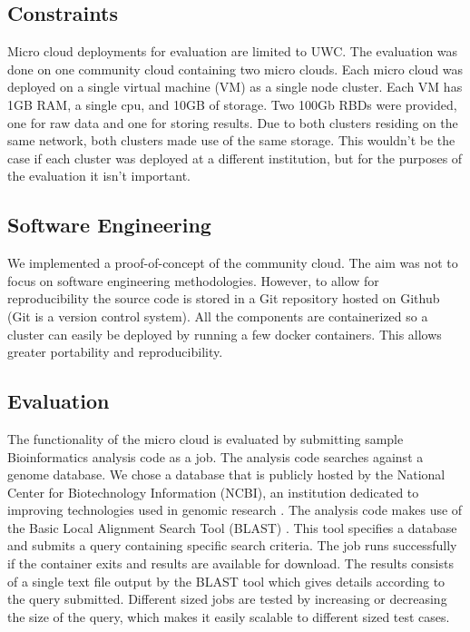 \documentclass{sig-alternate-05-2015}
\begin{document}
\subsection{Constraints}
Micro cloud deployments for evaluation are limited to UWC. The evaluation was done on one community cloud containing two micro clouds. Each micro cloud was deployed on a single virtual machine (VM) as a single node cluster. Each VM has 1GB RAM, a single cpu, and 10GB of storage. Two 100Gb RBDs were provided, one for raw data and one for storing results. Due to both clusters residing on the same network, both clusters made use of the same storage. This wouldn't be the case if each cluster was deployed at a different institution, but for the purposes of the evaluation it isn't important.

\subsection{Software Engineering}

We implemented a proof-of-concept of the community cloud. The aim was not to focus on software engineering methodologies. However, to allow for reproducibility the source code is stored in a Git repository hosted on Github (Git is a version control system). All the components are containerized so a cluster can easily be deployed by running a few docker containers. This allows greater portability and reproducibility. 




\subsection{Evaluation}
The functionality of the micro cloud is evaluated by submitting sample Bioinformatics analysis code as a job. The analysis code searches against a genome database. We chose a database that is publicly hosted by the National Center for Biotechnology Information (NCBI), an institution dedicated to improving technologies used in genomic research \cite{pruitt2005ncbi}. The analysis code makes use of the Basic Local Alignment Search Tool (BLAST) \cite{camacho2009blast}. This tool specifies a database and submits a query containing specific search criteria. The job runs successfully if the container exits and results are available for download. The results consists of a single text file output by the BLAST tool which gives details according to the query submitted. Different sized jobs are tested by increasing or decreasing the size of the query, which makes it easily scalable to different sized test cases.
\end{document}
